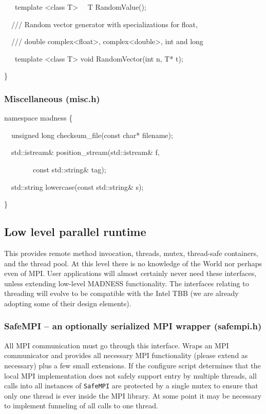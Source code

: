 \documentclass[letterpaper]{article}
\begin{document}
{\ttfamily
\ \ \ template {\textless}class T{\textgreater} \ \ T RandomValue();}

{\ttfamily
\ \ /// Random vector generator with specializations for float,}

{\ttfamily
\ \ /// double complex{\textless}float{\textgreater}, complex{\textless}double{\textgreater}, int and long}

{\ttfamily
\ \ \ template {\textless}class T{\textgreater} void RandomVector(int n, T* t);}

{\ttfamily
\}}

\subsubsection{Miscellaneous (misc.h)}
{\ttfamily
namespace madness \{}

{\ttfamily
\ \ unsigned long checksum\_file(const char* filename);}

{\ttfamily
\ \ std::istream\& position\_stream(std::istream\& f, }

{\ttfamily
\ \ \ \ \ \ \ \ const std::string\& tag);}

{\ttfamily
\ \ std::string lowercase(const std::string\& s);}

{\ttfamily
\}}

\subsection{Low level parallel runtime}
This provides remote method invocation, threads, mutex, thread-safe containers, and the thread pool. At this level there
is no knowledge of the World nor perhaps even of MPI. User applications will almost certainly never need these
interfaces, unless extending low-level MADNESS functionality. The interfaces relating to threading will evolve to be
compatible with the Intel TBB (we are already adopting some of their design elements).

\subsubsection{SafeMPI -- an optionally serialized MPI wrapper (safempi.h)}
All MPI communication must go through this interface. Wraps an MPI communicator and provides all necessary MPI
functionality (please extend as necessary) plus a few small extensions. If the configure script determines that the
local MPI implementation does not safely support entry by multiple threads, all calls into all instances of
\texttt{SafeMPI} are protected by a single mutex to ensure that only one thread is ever inside the MPI library. At some
point it may be necessary to implement funneling of all calls to one thread.
\end{document}
